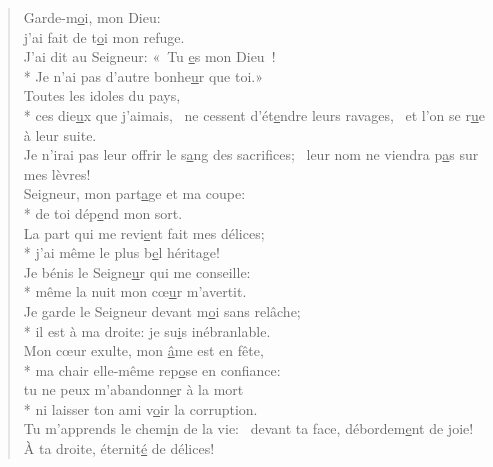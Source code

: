 
\begin{verse}
Garde-m\underline{o}i, mon Dieu: \\
j’ai fait de t\underline{o}i mon refuge. \\
J’ai dit au Seigneur: « Tu \underline{e}s mon Dieu ! \\*
Je n’ai pas d’autre bonhe\underline{u}r que toi.» \\

Toutes les idoles du pays, \\*
ces die\underline{u}x que j’aimais,~\psalmdagger
ne cessent d’ét\underline{e}ndre leurs ravages,~\psalmstar
et l’on se r\underline{u}e à leur suite. \\
Je n’irai pas leur offrir le s\underline{a}ng des sacrifices;~\psalmstar
leur nom ne viendra p\underline{a}s sur mes lèvres! \\

Seigneur, mon part\underline{a}ge et ma coupe: \\*
de toi dép\underline{e}nd mon sort. \\
La part qui me revi\underline{e}nt fait mes délices; \\*
j’ai même le plus b\underline{e}l héritage! \\

Je bénis le Seigne\underline{u}r qui me conseille: \\*
même la nuit mon cœ\underline{u}r m’avertit. \\
Je garde le Seigneur devant m\underline{o}i sans relâche; \\*
il est à ma droite: je su\underline{i}s inébranlable. \\

Mon cœur exulte, mon \underline{â}me est en fête, \\*
ma chair elle-même rep\underline{o}se en confiance: \\
tu ne peux m’abandonn\underline{e}r à la mort \\*
ni laisser ton ami v\underline{o}ir la corruption. \\

Tu m’apprends le chem\underline{i}n de la vie:~\psalmdagger
devant ta face, débordem\underline{e}nt de joie! \\
À ta droite, éternit\underline{é} de délices! \\
\end{verse}

